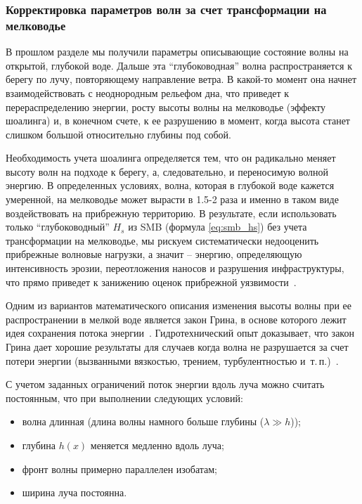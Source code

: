 
\subsubsection{Корректировка параметров волн за счет трансформации на мелководье}
\label{sec:seashoaring}

В прошлом разделе мы получили параметры описывающие состояние волны на открытой, глубокой воде.
Дальше эта \enquote{глубоководная} волна распространяется к берегу по лучу, повторяющему направление ветра.
В какой-то момент она начнет взаимодействовать с неоднородным рельефом дна, что приведет к перераспределению энергии, росту высоты волны на мелководье (эффекту шоалинга) и, в конечном счете, к ее разрушению в момент, когда высота станет слишком большой относительно глубины под собой. 

Необходимость учета шоалинга определяется тем, что он радикально меняет высоту волн на подходе к берегу, а, следовательно, и переносимую волной энергию.
В определенных условиях, волна, которая в глубокой воде кажется умеренной, на мелководье может вырасти в 1.5-2 раза и именно в таком виде воздействовать на прибрежную территорию.
В результате, если использовать только \enquote{глубоководный} $H_s$ из SMB (формула \eqref{eq:smb_hs}) без учета трансформации на мелководье, мы рискуем систематически недооценить прибрежные волновые нагрузки, а значит -- энергию, определяющую интенсивность эрозии, переотложения наносов и разрушения инфраструктуры, что прямо приведет к занижению оценок прибрежной уязвимости~\cite{Zhang2026EffectDirectionalityExtreme}.

Одним из вариантов математического описания изменения высоты волны при ее распространении в мелкой воде является закон Грина, в основе которого лежит идея сохранения потока энергии~\cite{jay_1991_greens_law}.
Гидротехнический опыт доказывает, что закон Грина дает хорошие результаты для случаев когда волна не разрушается за счет потери энергии (вызванными вязкостью, трением, турбулентностью и~т.\,п.)~\cite{greens_law_solitary_waves}.

С учетом заданных ограничений поток энергии вдоль луча можно считать постоянным, что при выполнении следующих условий:
\begin{itemize}
    \item волна длинная (длина волны намного больше глубины ($\lambda \gg h$));
    \item глубина $h(x)$ меняется медленно вдоль луча;
    \item фронт волны примерно параллелен изобатам;
    \item ширина луча постоянна.
\end{itemize}


